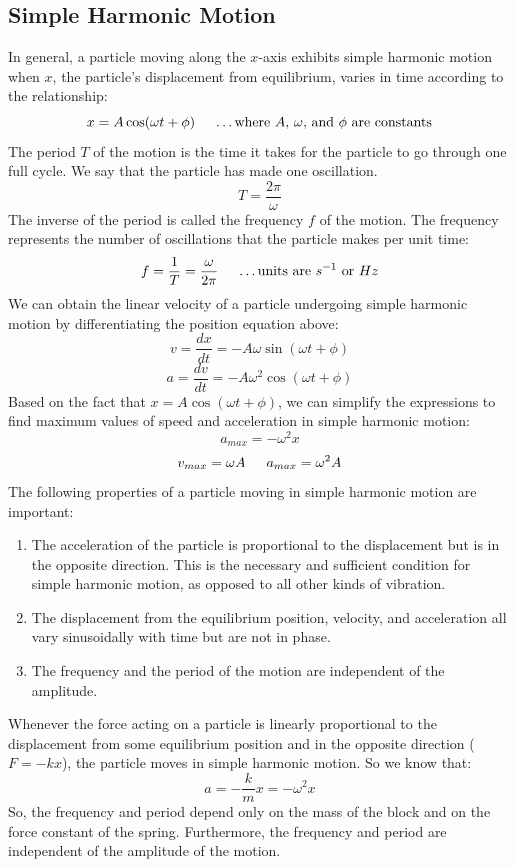\documentclass{article}
\begin{document}
\subsection{Simple Harmonic Motion}
In general, a particle moving along the $x$-axis exhibits simple harmonic motion when $x$, the particle’s displacement from equilibrium, varies in time according to the relationship:
\[
x=A\cos(\omega t+\phi) \indent
\text{\ldots where $A$, $\omega$, and $\phi$ are constants}
\]
The period $T$ of the motion is the time it takes for the particle to go through one full cycle. We say that the particle has made one oscillation.
\[
T=\frac{2\pi}{\omega}
\]
The inverse of the period is called the frequency $f$ of the motion. The frequency represents the number of oscillations that the particle makes per unit time:
\[
f=\frac{1}{T}=\frac{\omega}{2\pi} \indent
\text{\ldots units are $s^{-1}$ or $Hz$}
\]
We can obtain the linear velocity of a particle undergoing simple harmonic motion by differentiating the position equation above:
\[
v=\frac{dx}{dt}=-A\omega\sin(\omega t+\phi)
\]
\[
a=\frac{dv}{dt}=-A\omega^2\cos(\omega t+\phi)
\]
Based on the fact that $x=A\cos(\omega t+\phi)$, we can simplify the expressions to find maximum values of speed and acceleration in simple harmonic motion:
\[
a_{max}=-\omega^2x
\]
\[
v_{max}=\omega A \indent
a_{max}=\omega^2A
\]
The following properties of a particle moving in simple harmonic motion are important:\\
\begin{enumerate}
\item The acceleration of the particle is proportional to the displacement but is in the opposite direction. This is the necessary and sufficient condition for simple harmonic motion, as opposed to all other kinds of vibration.
\item The displacement from the equilibrium position, velocity, and acceleration all vary sinusoidally with time but are not in phase.
\item The frequency and the period of the motion are independent of the amplitude.\\
\end{enumerate}
Whenever the force acting on a particle is linearly proportional to the displacement from some equilibrium position and in the opposite direction ($F=-kx$), the particle moves in simple harmonic motion. So we know that:
\[
a=-\frac{k}{m}x=-\omega^2x
\]
So, the frequency and period depend only on the mass of the block and on the force constant of the spring. Furthermore, the frequency and period are independent of the amplitude of the motion.
\end{document}
